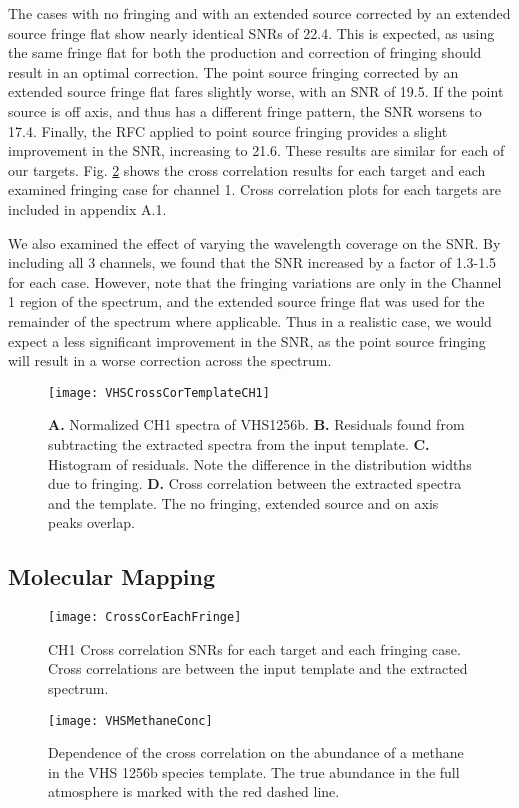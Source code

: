 The cases with no fringing and with an extended source corrected by an extended source fringe flat show nearly identical SNRs of 22.4.
This is expected, as using the same fringe flat for both the production and correction of fringing should result in an optimal correction.
The point source fringing corrected by an extended source fringe flat fares slightly worse, with an SNR of 19.5. 
If the point source is off axis, and thus has a different fringe pattern, the SNR worsens to 17.4.
Finally, the RFC applied to point source fringing provides a slight improvement in the SNR, increasing to 21.6.
These results are similar for each of our targets. 
Fig. \ref{fig:ccall} shows the cross correlation results for each target and each examined fringing case for channel 1.
Cross correlation plots for each targets are included in appendix A.1.

We also examined the effect of varying the wavelength coverage on the SNR. 
By including all 3 channels, we found that the SNR increased by a factor of 1.3-1.5 for each case. 
However, note that the fringing variations are only in the Channel 1 region of the spectrum, and the extended source fringe flat was used for the remainder of the spectrum where applicable.
Thus in a realistic case, we would expect a less significant improvement in the SNR, as the point source fringing will result in a worse correction across the spectrum.


\begin{figure}[h]
	\centering
	\texttt{[image: VHSCrossCorTemplateCH1]}
	\caption{\textbf{A.} Normalized CH1 spectra of VHS1256b. \textbf{B.} Residuals found from subtracting the extracted spectra from the input template. \textbf{C.} Histogram of residuals. Note the difference in the distribution widths due to fringing. \textbf{D.} Cross correlation between the extracted spectra and the template. The no fringing, extended source and on axis peaks overlap.}
	\label{fig:CrossCor1D}	
\end{figure}
\clearpage

\subsection{Molecular Mapping}
\begin{figure}[t]
	\texttt{[image: CrossCorEachFringe]}
	\caption{CH1 Cross correlation SNRs for each target and each fringing case. Cross correlations are between the input template and the extracted spectrum.}
	\label{fig:ccall}
\end{figure}
\begin{figure}[t]
	\texttt{[image: VHSMethaneConc]}
	\caption{Dependence of the cross correlation on the abundance of a methane in the VHS 1256b species template. The true abundance in the full atmosphere is marked with the red dashed line.}
	\label{fig:vhsmeth}
\end{figure}

